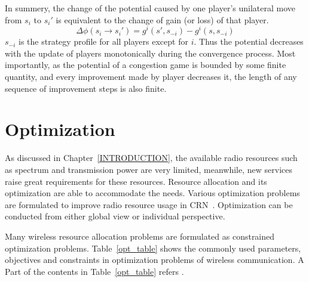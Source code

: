 In summery, the change of the potential caused by one player's unilateral move from $s_i$ to $s_i'$ is equivalent to the change of gain (or loss) of that player.
\begin{equation}
\label{5}
\varDelta \phi(s_i \rightarrow s_i') = g^i(s',s_{-i}) - g^i(s,s_{-i})
\end{equation}
$s_{-i}$ is the strategy profile for all players except for $i$.
Thus the potential decreases with the update of players monotonically during the convergence process.
Most importantly, as the potential of a congestion game is bounded by some finite quantity, and every improvement made by player decreases it, the length of any sequence of improvement steps is also finite.







\section{Optimization}
As discussed in Chapter~\ref{INTRODUCTION}, the available radio resources such as spectrum and transmission power are very limited, meanwhile, new services raise great requirements for these resources.
Resource allocation and its optimization are able to accommodate the needs.
Various optimization problems are formulated to improve radio resource usage in CRN~\cite{cacao_ca_2011, fuzzy_decision_09, resourceAllocation_imperfectSensing_2012}.
Optimization can be conducted from either global view or individual perspective.

Many wireless resource allocation problems are formulated as constrained optimization problems.
Table~\ref{opt_table} shows the commonly used parameters, objectives and constraints in optimization problems of wireless communication.
A Part of the contents in Table~\ref{opt_table} refers \cite{Han:2008:RAW:1457343}.

